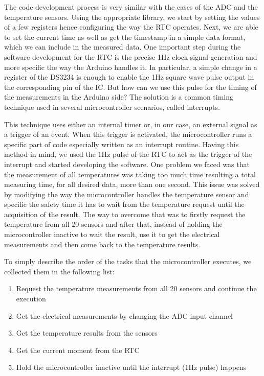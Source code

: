 The code development process is very similar with the cases of the ADC and the temperature sensors. Using the appropriate library, we start by setting the values of a few registers hence configuring the way the RTC operates. Next, we are able to set the current time as well as get the timestamp in a simple data format, which we can include in the measured data. One important step during the software development for the RTC is the precise 1Hz clock signal generation and more specific the way the Arduino handles it. In particular, a simple change in a register of the DS3234 is enough to enable the 1Hz square wave pulse output in the corresponding pin of the IC. But how can we use this pulse for the timing of the measurements in the Arduino side? The solution is a common timing technique used in several microcontroller scenarios, called interrupts.

This technique uses either an internal timer or, in our case, an external signal as a trigger of an event. When this trigger is activated, the microcontroller runs a specific part of code especially written as an interrupt routine. Having this method in mind, we used the 1Hz pulse of the RTC to act as the trigger of the interrupt and started developing the software. One problem we faced was that the measurement of all temperatures was taking too much time resulting a total measuring time, for all desired data, more than one second. This issue was solved by modifying the way the microcontroller handles the temperature sensor and specific the safety time it has to wait from the temperature request until the acquisition of the result. The way to overcome that was to firstly request the temperature from all 20 sensors and after that, instead of holding the microcontroller inactive to wait the result, use it to get the electrical measurements and then come back to the temperature results.

To simply describe the order of the tasks that the microcontroller executes, we collected them in the following list:

\begin{enumerate}
    \item Request the temperature measurements from all 20 sensors and continue the execution
    \item Get the electrical measurements by changing the ADC input channel
    \item Get the temperature results from the sensors
    \item Get the current moment from the RTC
    \item Hold the microcontroller inactive until the interrupt (1Hz pulse) happens
\end{enumerate}


